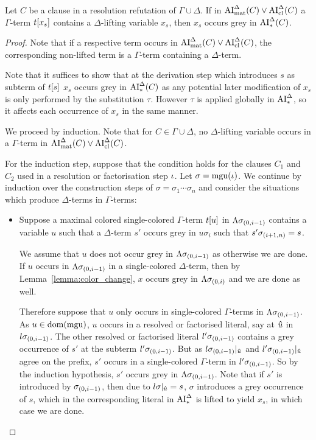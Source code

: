 \documentclass[,%
	draft=false,%
	numbers=noendperiod
	11pt,
	a4paper,
	oneside,%
	openany,
]{memoir}
\begin{document}
\begin{clemma}
 	Let $C$ be a clause in a resolution refutation of $\Gamma \cup \Delta$.
	If in $\operatorname{AI}_\mathrm{mat}^\Delta(C) \lor \operatorname{AI}_\mathrm{cl}^\Delta(C)$	a $\Gamma$-term $t[x_s]$ contains a $\Delta$-lifting variable $x_s$, then $x_s$ occurs grey in $\operatorname{AI}_\mathrm{*}^\Delta(C)$.

\end{clemma}
\begin{proof}
	Note that if a respective term occurs in $\operatorname{AI}_\mathrm{mat}^\Delta(C) \lor \operatorname{AI}_\mathrm{cl}^\Delta(C)$, the corresponding non-lifted term is a $\Gamma$-term containing a $\Delta$-term.

	Note that it suffices to show that at the derivation step which introduces $s$ as subterm of $t[s]$ $x_s$ occurs grey in $\operatorname{AI}_\mathrm{*}^\Delta(C)$ as any potential later modification of $x_s$ is only performed by the substitution $\tau$. 
	However $\tau$ is applied globally in $\operatorname{AI}_\mathrm{*}^\Delta$, so it affects each occurrence of $x_s$ in the same manner.

	We proceed by induction.
	Note that for $C\in \Gamma\cup\Delta$, no $\Delta$-lifting variable occurs in a $\Gamma$-term in $\operatorname{AI}_\mathrm{mat}^\Delta(C) \lor \operatorname{AI}_\mathrm{cl}^\Delta(C)$.

	For the induction step, suppose that the condition holds for the clauses $C_1$ and $C_2$ used in a resolution or factorisation step $\iota$.
	Let $\sigma = \operatorname{mgu}(\iota)$.
	We continue by induction over the construction steps of $\sigma = \sigma_1 \cdots \sigma_n$ and consider the situations which produce $\Delta$-terms in $\Gamma$-terms:
	\begin{itemize}
		\item Suppose a maximal colored single-colored $\Gamma$-term $t[u]$ in $\Lambda\sigma_{(0,i-1)}$ contains a variable $u$ such that a $\Delta$-term $s'$ occurs grey in $u\sigma_i$ such that $s'\sigma_{(i+1,n)} = s$.

			We assume that $u$ does not occur grey in $\Lambda\sigma_{(0,i-1)}$ as otherwise we are done.
			If $u$ occurs in $\Lambda\sigma_{(0,i-1)}$ in a single-colored $\Delta$-term, then by Lemma~\ref{lemma:color_change}, $x$ occurs grey in $\Lambda\sigma_{(0,i)}$ and we are done as well.

			Therefore suppose that $u$ only occurs in single-colored $\Gamma$-terms in $\Lambda\sigma_{(0,i-1)}$.
			As $u\in\operatorname{dom}(\operatorname{mgu})$, $u$ occurs in a resolved or factorised literal, say at $\bm\hat u$ in $l\sigma_{(0,i-1)}$.
			The other resolved or factorised literal $l'\sigma_{(0,i-1)}$ contains a grey occurrence of $s'$ at the subterm $l'\sigma_{(0,i-1)}$.
			But as $l\sigma_{(0,i-1)}|_{\bm\hat u}$ and $l'\sigma_{(0,i-1)}|_{\bm\hat u}$ agree on the prefix, $s'$ occurs in a single-colored $\Gamma$-term in $l'\sigma_{(0,i-1)}$.
			So by the induction hypothesis, $s'$ occurs grey in $\Lambda\sigma_{(0,i-1)}$.
			Note that if $s'$ is introduced by $\sigma_{(0,i-1)}$, then due to $l\sigma|_{\bm\hat u} = s$, $\sigma$ introduces a grey occurrence of $s$, which in the corresponding literal in $\operatorname{AI}_\mathrm{*}^\Delta$ is lifted to yield $x_s$, in which case we are done.


\end{itemize}
\end{proof}
\end{document}
